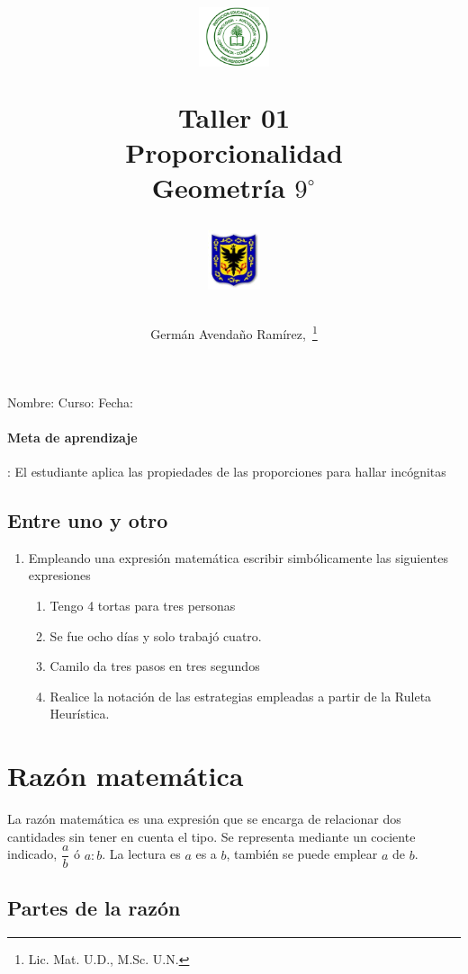 \documentclass[10pt,twoside]{article}
\author{Germ\'an Avenda\~no Ram\'irez,~\thanks{Lic. Mat. U.D., M.Sc. U.N.}}
\title{\begin{minipage}{.2\textwidth}
\includegraphics[height=1.75cm]{Images/logo-colegio.png}\end{minipage}
\begin{minipage}{.55\textwidth}
\begin{center}
Taller 01\\
Proporcionalidad\\
Geometr\'{i}a $9^{\circ}$
\end{center}
\end{minipage}\hfill
\begin{minipage}{.2\textwidth}
\includegraphics[height=1.75cm]{Images/logo-sed.png} 
\end{minipage}}
\date{}
\begin{document}
\maketitle
Nombre: \hrulefill Curso: \underline{\hspace*{44pt}} Fecha: \underline{\hspace*{2.5cm}}
\paragraph*{Meta de aprendizaje}: El estudiante aplica las propiedades de las proporciones para hallar incógnitas
\subsection*{Entre uno y otro}
\begin{enumerate}
\item Empleando una expresi\'{o}n matem\'{a}tica escribir simb\'{o}licamente las siguientes expresiones
\begin{enumerate}
\item Tengo 4 tortas para tres personas
\item Se fue ocho d\'{i}as y solo trabaj\'{o} cuatro.
\item Camilo da tres pasos en tres segundos
\item Realice la notaci\'{o}n de las estrategias empleadas a partir de la Ruleta Heur\'{i}stica.
\end{enumerate}
\end{enumerate}
\section*{Raz\'{o}n matem\'{a}tica}
La razón matemática es una expresión que se encarga de relacionar dos cantidades sin tener en cuenta el tipo. Se representa mediante un cociente indicado, $\dfrac{a}{b}$ \'{o} $a:b$. La lectura es $a$ es a $b$, también se puede emplear $a$ de $b$.
\subsection*{Partes de la raz\'{o}n}
 
\end{document}
